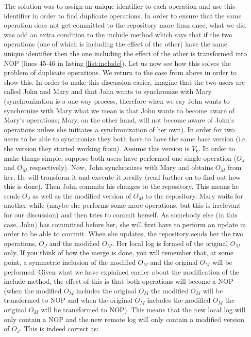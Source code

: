 The solution was to assign an unique identifier to each operation and use this identifier in order to find
duplicate operations. In order to ensure that the same operation does not get committed to the repository
more than once, what we did was add an extra condition to the include method which says that if the two
operations (one of which is including the effect of the other) have the same unique identifier then the
one including the effect of the other is transformed into NOP (lines 45-46 in listing \ref{list:include}).
Let us now see how this solves the problem of duplicate operations. We return to the case from above in
order to show this. In order to make this discussion easier, imagine that the two users are called John
and Mary and that John wants to synchronize with Mary (synchronization is a one-way process, therefore
when we say John wants to synchronize with Mary what we mean is that John wants to become aware of Mary's
operations; Mary, on the other hand, will not become aware of John's operations unless she initiates a
synchronization of her own). In order for two users to be able to synchronize they both have to have the
same base version (i.e. the version they started working from). Assume this version is $V_{k}$. In order to
make things simple, suppose both users have performed one single operation ($O_{J}$ and $O_{M}$ respectively).
Now, John
synchronizes with Mary and obtains $O_{M}$ from her. He will transform it and execute it locally (read further
on to find out how this is done). Then John commits his changes to the repository. This means he sends $O_{J}$
as well as the modified version of $O_{M}$ to the repository. Mary waits for another while (maybe she performs
some more operations, but this is irrelevant for our discussion) and then tries to commit herself. As somebody
else (in this case, John) has committed before her, she will first have to perform an update in order to be
able to commit. When she updates, the repository sends her the two operations, $O_{J}$ and the modified
$O_{M}$. Her local log is formed of the original $O_{M}$ only. If you think of how the merge is done, you
will remember that, at some point, a symmetric inclusion of the modified $O_{M}$ and the original $O_{M}$
will be performed. Given what we have explained earlier about the modification of the include method, the
effect of this is that both operations will become a NOP (when the modified $O_{M}$ includes the original
$O_{M}$ the modified $O_{M}$ will be transformed to NOP and when the original $O_{M}$ includes the
modified $O_{M}$ the original $O_{M}$ will be transformed to NOP). This means that the new local log will
only contain a NOP and the new remote log will only contain a modified version of $O_{J}$. This is indeed
correct as:


